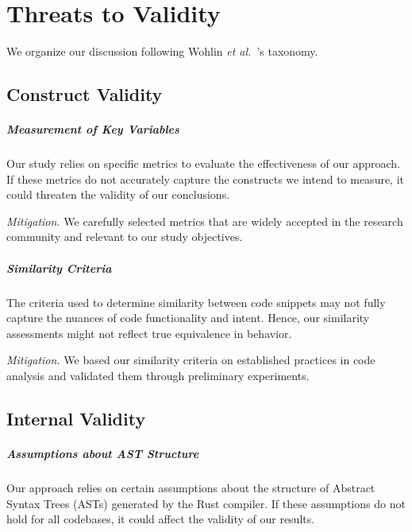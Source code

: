 \chapter{Threats to Validity}\label{chap:validity_threats}

We organize our discussion following Wohlin \textit{et al.}~\cite{Wohlin12}'s taxonomy.


\section{Construct Validity}\label{sec:construct-validity}

\paragraph{Measurement of Key Variables}
Our study relies on specific metrics to evaluate the effectiveness of our approach.
If these metrics do not accurately capture the constructs we intend to measure, it could threaten the validity of our conclusions.

\textit{Mitigation.}
We carefully selected metrics that are widely accepted in the research community and relevant to our study objectives.

\paragraph{Similarity Criteria}
The criteria used to determine similarity between code snippets may not fully capture the nuances of code functionality and intent.
Hence, our similarity assessments might not reflect true equivalence in behavior.

\textit{Mitigation.}
We based our similarity criteria on established practices in code analysis and validated them through preliminary experiments.


\section{Internal Validity}\label{sec:internal-validity}

\paragraph{Assumptions about AST Structure}
Our approach relies on certain assumptions about the structure of Abstract Syntax Trees (ASTs) generated by the Rust compiler.
If these assumptions do not hold for all codebases, it could affect the validity of our results.

